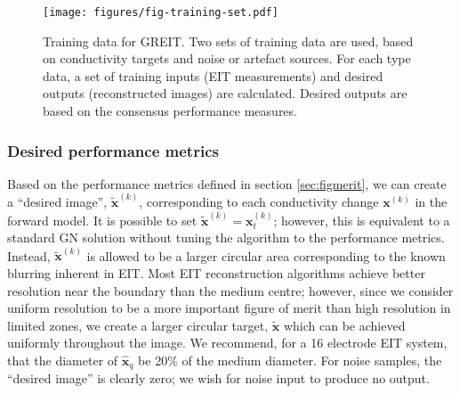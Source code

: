 \documentclass[12pt]{iopart}
\newcommand{\xB}{\mbox{$\mathbf{x}$}}
\newcommand{\xH}{\mbox{$\mathbf{\hat x}$}}
\newcommand{\xT}{\mbox{$\mathbf{\tilde x}$}}
\begin{document}
\begin{figure}[bhtp]
\begin{center}
\texttt{[image: figures/fig-training-set.pdf]}
\caption{ \label{fig:desired_performance}
Training data for GREIT. Two sets of training data are used, based on
conductivity targets and noise or artefact sources. For each type
data, a set of training inputs (EIT measurements) and desired
outputs (reconstructed images) are calculated. Desired outputs
are based on the consensus performance measures.
}
\end{center}
\end{figure}

 
\subsubsection{Desired performance metrics}

Based on the performance metrics defined
in section \ref{sec:figmerit},
we can create a ``desired image'',
$\xT^{(k)}$, corresponding to each conductivity change
$\xB^{(k)}$ in the forward model. It is possible to set
$\xT^{(k)} = \xB_t^{(k)}$; however, this is equivalent to a standard
GN solution without tuning the algorithm to the 
performance metrics. Instead, $\xT^{(k)}$ is allowed to be
a larger circular area corresponding to the known
blurring inherent in EIT. Most EIT reconstruction algorithms
achieve better resolution near the boundary than the medium
centre; however, since we consider uniform resolution to
be a more important figure of merit than high resolution
in limited zones, we create a larger circular target, $\xT$
which can be achieved uniformly throughout the image.
We recommend, for a 16 electrode
EIT system, that the diameter of $\xH_q$
be 20\% of the medium diameter.
For noise samples, the ``desired image'' is clearly
zero; we wish for noise input to produce no output.
\end{document}
